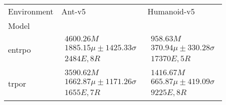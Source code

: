 \begin{tabular}{|l|p{6cm}|p{6cm}|}
\toprule
Environment & Ant-v5 & Humanoid-v5 \\
Model &  &  \\
\midrule
entrpo & $\begin{array}{c} 4600.26M \\ 1885.15\mu \pm 1425.33\sigma \\ 2484E, 8R \end{array}$ & $\begin{array}{c} 958.63M \\ 370.94\mu \pm 330.28\sigma \\ 17370E, 5R \end{array}$ \\
trpor & $\begin{array}{c} 3590.62M \\ 1662.87\mu \pm 1171.26\sigma \\ 1655E, 7R \end{array}$ & $\begin{array}{c} 1416.67M \\ 665.87\mu \pm 419.09\sigma \\ 9225E, 8R \end{array}$ \\
\bottomrule
\end{tabular}
